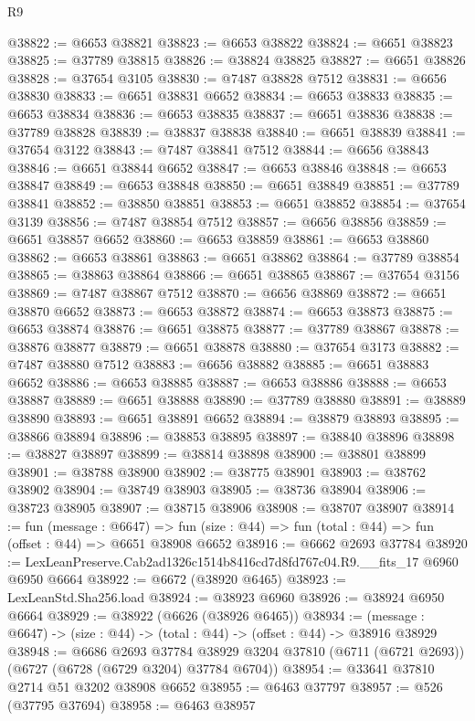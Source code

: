 \begin{lexlean}{R9}
\begin{coremodule}
@38822 := @6653 @38821
@38823 := @6653 @38822
@38824 := @6651 @38823
@38825 := @37789 @38815
@38826 := @38824 @38825
@38827 := @6651 @38826
@38828 := @37654 @3105
@38830 := @7487 @38828 @7512
@38831 := @6656 @38830
@38833 := @6651 @38831 @6652
@38834 := @6653 @38833
@38835 := @6653 @38834
@38836 := @6653 @38835
@38837 := @6651 @38836
@38838 := @37789 @38828
@38839 := @38837 @38838
@38840 := @6651 @38839
@38841 := @37654 @3122
@38843 := @7487 @38841 @7512
@38844 := @6656 @38843
@38846 := @6651 @38844 @6652
@38847 := @6653 @38846
@38848 := @6653 @38847
@38849 := @6653 @38848
@38850 := @6651 @38849
@38851 := @37789 @38841
@38852 := @38850 @38851
@38853 := @6651 @38852
@38854 := @37654 @3139
@38856 := @7487 @38854 @7512
@38857 := @6656 @38856
@38859 := @6651 @38857 @6652
@38860 := @6653 @38859
@38861 := @6653 @38860
@38862 := @6653 @38861
@38863 := @6651 @38862
@38864 := @37789 @38854
@38865 := @38863 @38864
@38866 := @6651 @38865
@38867 := @37654 @3156
@38869 := @7487 @38867 @7512
@38870 := @6656 @38869
@38872 := @6651 @38870 @6652
@38873 := @6653 @38872
@38874 := @6653 @38873
@38875 := @6653 @38874
@38876 := @6651 @38875
@38877 := @37789 @38867
@38878 := @38876 @38877
@38879 := @6651 @38878
@38880 := @37654 @3173
@38882 := @7487 @38880 @7512
@38883 := @6656 @38882
@38885 := @6651 @38883 @6652
@38886 := @6653 @38885
@38887 := @6653 @38886
@38888 := @6653 @38887
@38889 := @6651 @38888
@38890 := @37789 @38880
@38891 := @38889 @38890
@38893 := @6651 @38891 @6652
@38894 := @38879 @38893
@38895 := @38866 @38894
@38896 := @38853 @38895
@38897 := @38840 @38896
@38898 := @38827 @38897
@38899 := @38814 @38898
@38900 := @38801 @38899
@38901 := @38788 @38900
@38902 := @38775 @38901
@38903 := @38762 @38902
@38904 := @38749 @38903
@38905 := @38736 @38904
@38906 := @38723 @38905
@38907 := @38715 @38906
@38908 := @38707 @38907
@38914 := fun (message : @6647) =>
  fun (size : @44) => fun (total : @44) => fun (offset : @44) => @6651 @38908 @6652
@38916 := @6662 @2693 @37784
@38920 := LexLeanPreserve.Cab2ad1326c1514b8416cd7d8fd767c04.R9.__fits_17 @6960 @6950 @6664
@38922 := @6672 (@38920 @6465)
@38923 := LexLeanStd.Sha256.load
@38924 := @38923 @6960
@38926 := @38924 @6950 @6664
@38929 := @38922 (@6626 (@38926 @6465))
@38934 := (message : @6647) -> (size : @44) -> (total : @44) -> (offset : @44) -> @38916 @38929
@38948 := @6686
    @2693
    @37784
    @38929
    @3204
    @37810
    (@6711 (@6721 @2693))
    (@6727 (@6728 (@6729 @3204) @37784 @6704))
@38954 := @33641 @37810 @2714 @51 @3202 @38908 @6652
@38955 := @6463 @37797
@38957 := @526 (@37795 @37694)
@38958 := @6463 @38957

\end{coremodule}
\end{lexlean}
